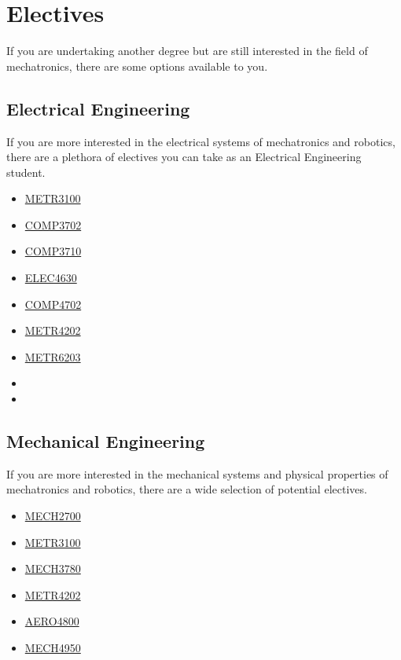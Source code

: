 \chapter{Electives}
If you are undertaking another degree but are still interested in the field of mechatronics, there are some options available to you.

\section{Electrical Engineering}
If you are more interested in the electrical systems of mechatronics and robotics, there are a plethora of electives you can take as an Electrical Engineering student.
\begin{multicols}{3}
    \begin{itemize}
        \item \hyperlink{METR3100}{METR3100}
        \item \hyperlink{COMP3702}{COMP3702}
        \item \hyperlink{COMP3710}{COMP3710}
        \item \hyperlink{ELEC4630}{ELEC4630}
        \item \hyperlink{COMP4702}{COMP4702}
        \item \hyperlink{METR4202}{METR4202}
        \item \hyperlink{METR6203}{METR6203}
        \item[]
        \item[]
    \end{itemize}
\end{multicols}

\section{Mechanical Engineering}
If you are more interested in the mechanical systems and physical properties of mechatronics and robotics, there are a wide selection of potential electives.
\begin{multicols}{3}
    \begin{itemize}
        \item \hyperlink{MECH2700}{MECH2700}
        \item \hyperlink{METR3100}{METR3100}
        \item \hyperlink{MECH3780}{MECH3780}
        \item \hyperlink{METR4202}{METR4202}
        \item \hyperlink{AERO4800}{AERO4800}
        \item \hyperlink{MECH4950}{MECH4950}
    \end{itemize}
\end{multicols}

